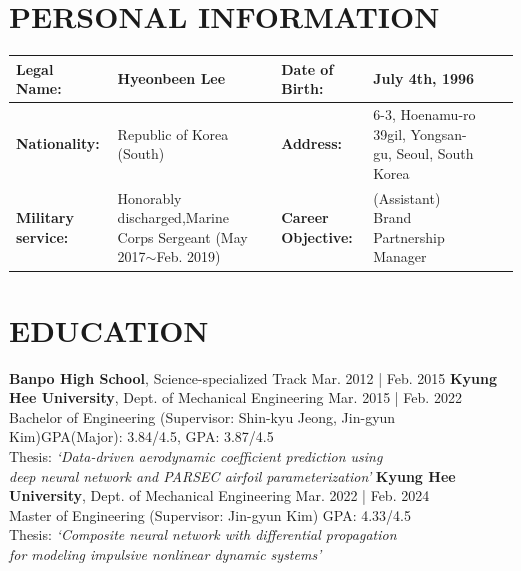 \documentclass[a4paper,10pt]{extarticle}
\begin{document}
\renewcommand*{\arraystretch}{1.5}
\noindent
\section*{PERSONAL INFORMATION}
\begin{center}
	\vspace*{-0.8cm}
	\noindent
	\begin{longtable}{LRLRLR}
		\textbf{Legal Name:}       & Hyeonbeen Lee                                                                            & \textbf{Date of Birth:}     & July 4th, 1996                                                       \\
		\hline
		\textbf{Nationality:}      & Republic of Korea (South)                                                                & \textbf{Address:}           & 6-3, Hoenamu-ro 39gil, Yongsan-gu, Seoul, South Korea                \\
		\hline
		\textbf{Military service:} & Honorably discharged,\linebreak Marine Corps Sergeant {\small (May 2017$\sim$Feb. 2019)} & \textbf{Career Objective:} & (Assistant) Brand Partnership Manager \\
		\hline
	\end{longtable}
\end{center}

\section*{EDUCATION}
\noindent
\textbf{Banpo High School}, Science-specialized Track \hfill Mar. 2012 | Feb. 2015
\newline
\textbf{Kyung Hee University}, Dept. of Mechanical Engineering \hfill Mar. 2015 | Feb. 2022\\ %
Bachelor of Engineering (Supervisor: Shin-kyu Jeong, Jin-gyun Kim)\hfill GPA(Major): 3.84/4.5, GPA: 3.87/4.5\\ %
Thesis: \textit{{\small `Data-driven aerodynamic coefficient prediction using}}\\
\hspace*{1.3cm}\textit{{\small deep neural
			network and PARSEC airfoil parameterization'}}
\newline
\textbf{Kyung Hee University}, Dept. of Mechanical Engineering \hfill Mar. 2022 | Feb. 2024\\ %
Master of Engineering (Supervisor: Jin-gyun Kim) \hfill GPA: 4.33/4.5\\ %
Thesis: \textit{{\small `Composite neural network with differential propagation}}\\
\hspace*{1.3cm}\textit{\small{for modeling impulsive nonlinear dynamic systems'}}
\end{document}
